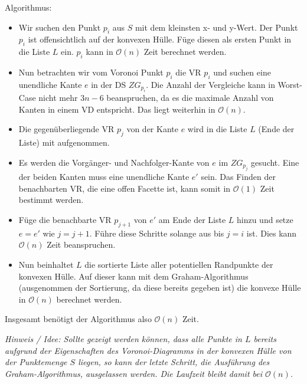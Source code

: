 \documentclass[a4paper]{article}
\begin{document}
Algorithmus:

\begin{itemize}

\item Wir suchen den Punkt $p_i$ aus $S$ mit dem kleinsten x- und y-Wert. Der Punkt $p_i$ ist offensichtlich auf der konvexen Hülle. Füge diesen als ersten Punkt in die Liste $L$ ein. $p_i$ kann in $\mathcal{O}(n)$ Zeit berechnet werden.

\item Nun betrachten wir vom Voronoi Punkt $p_i$ die VR $p_i$ und suchen eine unendliche Kante $e$ in der DS $ZG_{p_i}$. Die Anzahl der Vergleiche kann in Worst-Case nicht mehr $3 n-6$ beanspruchen, da es die maximale Anzahl von Kanten in einem VD entspricht. Das liegt weiterhin in $\mathcal{O}(n)$.

\item Die gegenüberliegende VR $p_j$ von der Kante $e$ wird in die Liste $L$ (Ende der Liste) mit aufgenommen.

\item Es werden die Vorgänger- und Nachfolger-Kante von $e$ im $ZG_{p_j}$ gesucht. Eine der beiden Kanten muss eine unendliche Kante $e'$ sein. Das Finden der benachbarten VR, die eine offen Facette ist, kann somit in $\mathcal{O}(1)$ Zeit bestimmt werden. 

\item Füge die benachbarte VR $p_{j+1}$ von $e'$ am Ende der Liste $L$ hinzu und setze $e = e'$ wie $j=j+1$. Führe diese Schritte solange aus bis $j=i$ ist. Dies kann $\mathcal{O}(n)$ Zeit beanspruchen.

\item Nun beinhaltet $L$ die sortierte Liste aller potentiellen Randpunkte der konvexen Hülle. Auf dieser kann mit dem Graham-Algorithmus (ausgenommen der Sortierung, da diese bereits gegeben ist) die konvexe Hülle in $\mathcal{O}(n)$ berechnet werden.

\end{itemize}

Insgesamt benötigt der Algorithmus also $\mathcal{O}(n)$ Zeit. \vspace*{0.5cm}

\textit{Hinweis / Idee: 
Sollte gezeigt werden können, dass alle Punkte in $L$ bereits aufgrund der Eigenschaften des Voronoi-Diagramms in der konvexen Hülle von der Punktemenge $S$ liegen, so kann der letzte Schritt, die Ausführung des Graham-Algorithmus, ausgelassen werden.
Die Laufzeit bleibt damit bei $\mathcal{O}(n)$. }
\end{document}
